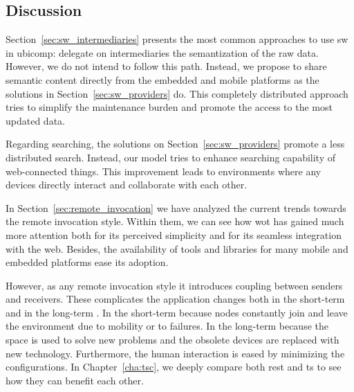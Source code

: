 \subsection{Discussion}


Section~\ref{sec:sw_intermediaries} presents the most common approaches to use \ac{sw} in \ac{ubicomp}: delegate on intermediaries the semantization of the raw data.
However, we do not intend to follow this path.
Instead, we propose to share semantic content directly from the embedded and mobile platforms as the solutions in Section~\ref{sec:sw_providers} do.
This completely distributed approach tries to simplify the maintenance burden and promote the access to the most updated data.


Regarding searching, the solutions on Section~\ref{sec:sw_providers} promote a less distributed search.
Instead, our model tries to enhance searching capability of web-connected things.
This improvement leads to environments where any devices directly interact and collaborate with each other.



In Section~\ref{sec:remote_invocation} we have analyzed the current trends towards the remote invocation style.
Within them, we can see how \ac{wot} has gained much more attention both for its perceived simplicity and for its seamless integration with the web.
Besides, the availability of tools and libraries for many mobile and embedded platforms ease its adoption.



\bigskip


However, as any remote invocation style it introduces coupling between senders and receivers.
These complicates the application changes both in the short-term and in the long-term \citep{johanson_extending_2004}.
In the short-term because nodes constantly join and leave the environment due to mobility or to failures.
In the long-term because the space is used to solve new problems and the obsolete devices are replaced with new technology.
Furthermore, the human interaction is eased by minimizing the configurations.
In Chapter~\ref{cha:tsc}, we deeply compare both \ac{rest} and \ac{ts} to see how they can benefit each other.



